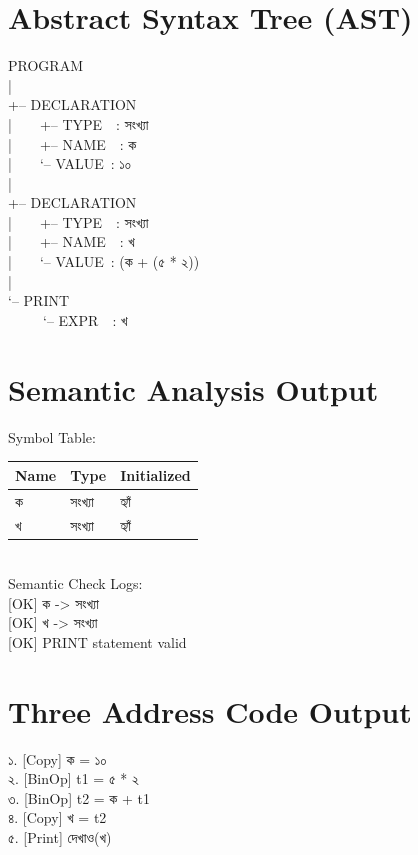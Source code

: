 \documentclass[12pt, a4paper]{report}
\begin{document}
\section{Abstract Syntax Tree (AST)}
\begin{tcolorbox}[colback=codegray,colframe=black!20,arc=0mm,boxrule=0.5pt,left=10pt,right=10pt,top=4pt,bottom=4pt]
\ttfamily\small
PROGRAM\\
|\\
+-- DECLARATION\\
|~~~~+-- TYPE~~: সংখ্যা\\
|~~~~+-- NAME~~: ক\\
|~~~~`-- VALUE~: ১০\\
|\\
+-- DECLARATION\\
|~~~~+-- TYPE~~: সংখ্যা\\
|~~~~+-- NAME~~: খ\\
|~~~~`-- VALUE~: (ক + (৫ * ২))\\
|\\
`-- PRINT\\
~~~~~`-- EXPR~~: খ
\end{tcolorbox}

\section{Semantic Analysis Output}
\begin{tcolorbox}[colback=codegray,colframe=black!20,arc=0mm,boxrule=0.5pt,left=10pt,right=10pt,top=4pt,bottom=4pt]
\ttfamily\small
Symbol Table:\\[2pt]
\begin{tabular}{|l|l|l|}
\hline
\textbf{Name} & \textbf{Type} & \textbf{Initialized} \\
\hline
ক & সংখ্যা & হ্যাঁ \\
খ & সংখ্যা & হ্যাঁ \\
\hline
\end{tabular}\\[8pt]
Semantic Check Logs:\\
{[}OK{]} ক -> সংখ্যা\\
{[}OK{]} খ -> সংখ্যা\\
{[}OK{]} PRINT statement valid
\end{tcolorbox}

\clearpage
\section{Three Address Code Output}
\begin{tcolorbox}[colback=codegray,colframe=black!20,arc=0mm,boxrule=0.5pt,left=10pt,right=10pt,top=3pt,bottom=3pt,before=\vspace{1pt},after=\vspace{3pt}]
\ttfamily\small
১. [Copy] ক = ১০\\
২. [BinOp] t1 = ৫ * ২\\
৩. [BinOp] t2 = ক + t1\\
৪. [Copy] খ = t2\\
৫. [Print] দেখাও(খ)
\end{tcolorbox}
\end{document}
